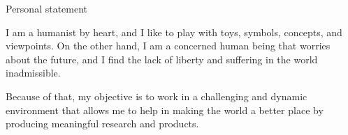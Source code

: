 \begin{rubric}{Personal statement}{

\entry* 
  I am a humanist by heart, and I like to play with toys, symbols,
  concepts, and viewpoints. On the other hand, I am a concerned human
  being that worries about the future, and I find the lack of liberty
  and suffering in the world inadmissible.

  Because of that, my objective is to work in a challenging and
  dynamic environment that allows me to help in making the world a
  better place by producing meaningful research and products.
}
\end{rubric}
